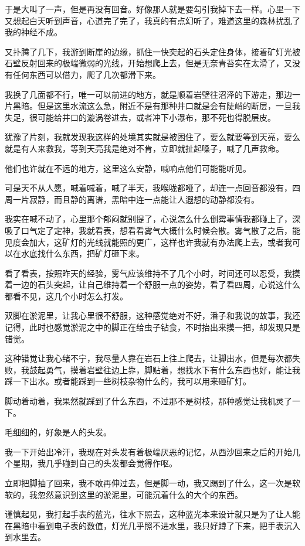 于是大叫了一声，但是再没有回音。好像那人就是要勾引我掉下去一样。心里一下又想起白天听到声音，心道完了完了，我真的有点幻听了，难道这里的森林扰乱了我的神经不成。

又扑腾了几下，我游到断崖的边缘，抓住一快突起的石头定住身体，接着矿灯光被石壁反射回来的极端微弱的光线，开始想爬上去，但是无奈青苔实在太滑了，又没有任何东西可以借力，爬了几次都滑下来。

我换了几面都不行，唯一可以前进的地方，就是顺着岩壁往沼泽的下游走，那边一片黑暗。但是这里水流这么急，附近不是有那种井口就是会有陡峭的断层，一旦我失足，很可能给井口的漩涡卷进去，或者冲下小瀑布，那不死也得脱层皮。

犹豫了片刻，我就发现我这样的处境其实就是被困住了，要么就要等到天亮，要么就是有人来救我，等到天亮我是绝对不肯，立即就扯起嗓子，喊了几声救命。

他们也许就在不远的地方，这里这么安静，喊响点他们可能能听见。

可是天不从人愿，喊着喊着，喊了半天，我喉咙都哑了，却连一点回音都没有，四周一片寂静，而且静的离谱，黑暗中连一点能让人遐想的动静都没有。

我实在喊不动了，心里那个郁闷就别提了，心说怎么什么倒霉事情我都碰上了，深吸了口气定了定神，我就看表，想看看雾气大概什么时候会散。雾气散了之后，能见度会加大，这矿灯的光线就能照的更广，这样也许我就有办法爬上去，或者我可以在水底找什么东西，把矿灯砸下来。

看了看表，按照昨天的经验，雾气应该维持不了几个小时，时间还可以忍受，我摸着一边的石头突起，让自己维持着一个舒服一点的姿势，看了看四周，心说这什么都看不见，这几个小时怎么打发。

双脚在淤泥里，让我心里很不舒服，这种感觉绝对不好，潘子和我说的故事，我还记得，此时也感觉淤泥之中的脚正在给虫子钻食，不时抬出来摸一把，却发现只是错觉。

这种错觉让我心绪不宁，我尽量人靠在岩石上往上爬去，让脚出水，但是每次都失败，我鼓起勇气，摸着岩壁往边上靠，脚贴着，想找水下有什么东西也好，能让我踩一下出水。或者能踩到一些树枝杂物什么的，我可以用来砸矿灯。

脚动着动着，我果然就踩到了什么东西，不过那不是树枝，那种感觉让我机灵了一下。

毛细细的，好象是人的头发。

我一下开始出冷汗，我现在对头发有着极端厌恶的记忆，从西沙回来之后的开始几个星期，我几乎碰到自己的头发都会觉得作呕。

立即把脚抽了回来，我不敢再伸过去，但是脚一动，我又踢到了什么，这一次是软软的，我忽然意识到这里的淤泥里，可能沉着什么的大个的东西。

谨慎起见，我打起手表的蓝光，往水下照去，这种蓝光本来设计就只是为了让人能在黑暗中看到电子表的数值，灯光几乎照不进水里，我只好蹲了下来，把手表沉入到水里去。


